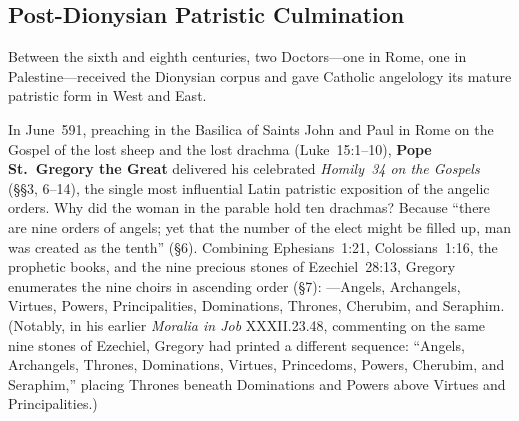 \subsection{Post-Dionysian Patristic Culmination}
\label{subsec:post-dionysian-fathers}

Between the sixth and eighth centuries, two Doctors---one in Rome, one in Palestine---received the Dionysian corpus and gave Catholic angelology its mature patristic form in West and East.

In June~591, preaching in the Basilica of Saints John and Paul in Rome on the Gospel of the lost sheep and the lost drachma (Luke~15:1--10), \textbf{Pope St.~Gregory the Great} delivered his celebrated \emph{Homily~34 on the Gospels} (\S\S 3, 6--14), the single most influential Latin patristic exposition of the angelic orders. Why did the woman in the parable hold ten drachmas? Because ``there are nine orders of angels; yet that the number of the elect might be filled up, man was created as the tenth'' (\S 6). Combining Ephesians~1:21, Colossians~1:16, the prophetic books, and the nine precious stones of Ezechiel~28:13, Gregory enumerates the nine choirs in ascending order (\S 7): ---Angels, Archangels, Virtues, Powers, Principalities, Dominations, Thrones, Cherubim, and Seraphim. (Notably, in his earlier \emph{Moralia in Job} XXXII.23.48, commenting on the same nine stones of Ezechiel, Gregory had printed a different sequence: ``Angels, Archangels, Thrones, Dominations, Virtues, Princedoms, Powers, Cherubim, and Seraphim,'' placing Thrones beneath Dominations and Powers above Virtues and Principalities.)

